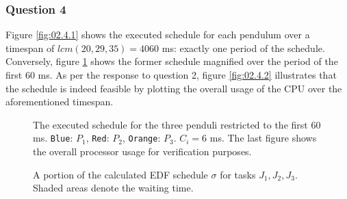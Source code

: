 \subsubsection{Question 4}

Figure \ref{fig:02.4.1} shows the executed schedule for each pendulum over a
timespan of $lcm(20,29,35) = 4060$ ms: exactly one period of the schedule.
Conversely, figure \ref{fig:02.4.1.small} shows the former schedule magnified
over the period of the first 60 ms.
As per the response to question 2, figure \ref{fig:02.4.2} illustrates that the
schedule is indeed feasible by plotting the overall usage of the CPU over the
aforementioned timespan.


\begin{sidewaysfigure}

  \begin{figure}[H]\centering
    \scalebox{1}{}
    \caption{The executed schedule for the three penduli restricted to the first
        60 ms. \texttt{Blue}: $P_1$, \texttt{Red}: $P_2$,
        \texttt{Orange}: $P_3$. $C_i = 6$ ms. The last figure shows the overall
      processor usage for verification purposes.}
    \label{fig:02.4.1.small}
  \end{figure}

  \begin{figure}[H]\centering
    \scalebox{0.7}{}
    \caption{A portion of the calculated EDF schedule $\sigma$ for tasks
      $J_1, J_2, J_3$. Shaded areas denote the waiting time.}
    \label{fig:edf_6}
  \end{figure}

\end{sidewaysfigure}

\noindent{}
